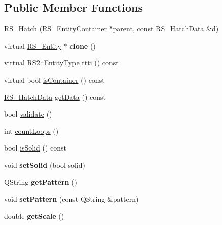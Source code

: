 \subsection*{Public Member Functions}
\begin{DoxyCompactItemize}
\item 
\hyperlink{classRS__Hatch_a937772e393acad59a5c37efa881a5142}{R\-S\-\_\-\-Hatch} (\hyperlink{classRS__EntityContainer}{R\-S\-\_\-\-Entity\-Container} $\ast$\hyperlink{classRS__Entity_a80358a8d2fc6739a516a278dc500b49f}{parent}, const \hyperlink{classRS__HatchData}{R\-S\-\_\-\-Hatch\-Data} \&d)
\item 
\hypertarget{classRS__Hatch_a710abc8ca6ab4031dc73a921fa4b8682}{virtual \hyperlink{classRS__Entity}{R\-S\-\_\-\-Entity} $\ast$ {\bfseries clone} ()}\label{classRS__Hatch_a710abc8ca6ab4031dc73a921fa4b8682}

\item 
virtual \hyperlink{classRS2_a8f26d1b981e1e85cff16738b43337e6a}{R\-S2\-::\-Entity\-Type} \hyperlink{classRS__Hatch_a5b6786a83520bc6c32265e01f19e0d3e}{rtti} () const 
\item 
virtual bool \hyperlink{classRS__Hatch_a8f8ec47f35811e91eac47b9cffbfdfe2}{is\-Container} () const 
\item 
\hyperlink{classRS__HatchData}{R\-S\-\_\-\-Hatch\-Data} \hyperlink{classRS__Hatch_aca807c373b9f5318943327403425d22c}{get\-Data} () const 
\item 
bool \hyperlink{classRS__Hatch_a7365f0a8552c603820773734b4f7c7fe}{validate} ()
\item 
int \hyperlink{classRS__Hatch_a93946e5d803f716e5f2a3e8469e35dd3}{count\-Loops} ()
\item 
bool \hyperlink{classRS__Hatch_a51b6c2c406ad28e13464613c436b94bd}{is\-Solid} () const 
\item 
\hypertarget{classRS__Hatch_a28289153088e6195c079f9814f349b2a}{void {\bfseries set\-Solid} (bool solid)}\label{classRS__Hatch_a28289153088e6195c079f9814f349b2a}

\item 
\hypertarget{classRS__Hatch_ab1bba044635f02d56130820847f91bde}{Q\-String {\bfseries get\-Pattern} ()}\label{classRS__Hatch_ab1bba044635f02d56130820847f91bde}

\item 
\hypertarget{classRS__Hatch_afc88330efc26502d216288b9d517ac5e}{void {\bfseries set\-Pattern} (const Q\-String \&pattern)}\label{classRS__Hatch_afc88330efc26502d216288b9d517ac5e}

\item 
\hypertarget{classRS__Hatch_a3061dc086629733728134d7b7b521b8f}{double {\bfseries get\-Scale} ()}\label{classRS__Hatch_a3061dc086629733728134d7b7b521b8f}


\end{DoxyCompactItemize}
